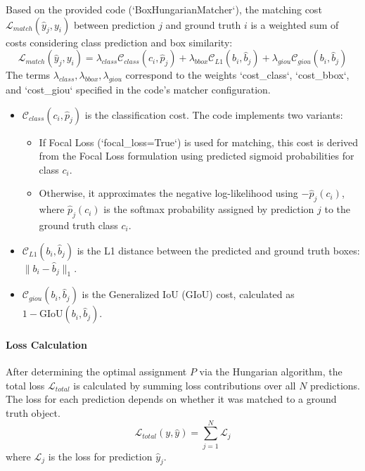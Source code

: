 Based on the provided code (`BoxHungarianMatcher`), the matching cost $ \mathcal{L}_{match}(\hat{y}_j, y_i) $ between prediction $ j $ and ground truth $ i $ is a weighted sum of costs considering class prediction and box similarity:
\begin{equation}
    \mathcal{L}_{match}(\hat{y}_j, y_i) = \lambda_{class} \mathcal{C}_{class}(c_i, \hat{p}_j) + \lambda_{bbox} \mathcal{C}_{L1}(b_i, \hat{b}_j) + \lambda_{giou} \mathcal{C}_{giou}(b_i, \hat{b}_j)
    \label{eq:match_cost_revised}
\end{equation}
The terms $ \lambda_{class}, \lambda_{bbox}, \lambda_{giou} $ correspond to the weights `cost_class`, `cost_bbox`, and `cost_giou` specified in the code's matcher configuration.
\begin{itemize}
    \item $ \mathcal{C}_{class}(c_i, \hat{p}_j) $ is the classification cost. The code implements two variants:
        \begin{itemize}
            \item If Focal Loss (`focal_loss=True`) is used for matching, this cost is derived from the Focal Loss formulation using predicted sigmoid probabilities for class $c_i$.
            \item Otherwise, it approximates the negative log-likelihood using $ -\hat{p}_j(c_i) $, where $ \hat{p}_j(c_i) $ is the softmax probability assigned by prediction $j$ to the ground truth class $ c_i $.
        \end{itemize}
    \item $ \mathcal{C}_{L1}(b_i, \hat{b}_j) $ is the L1 distance between the predicted and ground truth boxes: $ \|b_i - \hat{b}_j\|_1 $.
    \item $ \mathcal{C}_{giou}(b_i, \hat{b}_j) $ is the Generalized IoU (GIoU) cost, calculated as $ 1 - \text{GIoU}(b_i, \hat{b}_j) $.
\end{itemize}

\paragraph{Loss Calculation}
After determining the optimal assignment $ P $ via the Hungarian algorithm, the total loss $ \mathcal{L}_{total} $ is calculated by summing loss contributions over all $N$ predictions. The loss for each prediction depends on whether it was matched to a ground truth object.
\begin{equation}
    \mathcal{L}_{total}(y, \hat{y}) = \sum_{j=1}^N \mathcal{L}_j
    \label{eq:total_loss_revised}
\end{equation}
where $ \mathcal{L}_j $ is the loss for prediction $ \hat{y}_j $.

